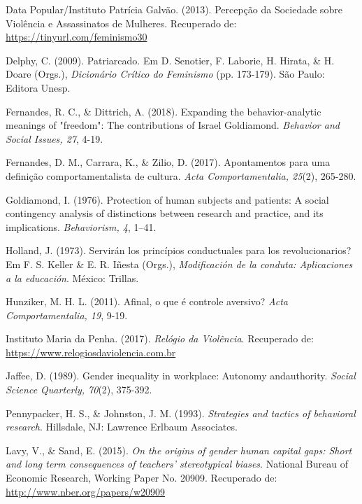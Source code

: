 \hangindent=25pt
\noindent Data Popular/Instituto Patrícia Galvão. (2013). Percepção da Sociedade sobre Violência e Assassinatos de Mulheres. Recuperado de: 
\url{https://tinyurl.com/feminismo30}

\hangindent=25pt
\noindent Delphy, C. (2009). Patriarcado. Em D. Senotier, F. Laborie, H. Hirata, \& H. Doare (Orgs.), \textit{Dicionário Crítico do Feminismo} (pp. 173-179). São Paulo: Editora Unesp.

\hangindent=25pt
\noindent Fernandes, R. C., \& Dittrich, A. (2018). Expanding the behavior-analytic meanings of "freedom": The contributions of Israel Goldiamond. \textit{Behavior and Social Issues, 27}, 4-19.

\hangindent=25pt
\noindent Fernandes, D. M., Carrara, K., \& Zilio, D. (2017). Apontamentos para uma definição comportamentalista de cultura. \textit{Acta Comportamentalia, 25}(2), 265-280.

\hangindent=25pt
\noindent Goldiamond, I. (1976). Protection of human subjects and patients: A social contingency analysis of distinctions between research and practice, and its implications. \textit{Behaviorism, 4}, 1–41.

\hangindent=25pt
\noindent Holland, J. (1973). Servirán los princípios conductuales para los revolucionarios? Em F. S. Keller \& E. R. Iñesta (Orgs.), \textit{Modificación de la conduta: Aplicaciones a la educación}. México: Trillas.

\hangindent=25pt
\noindent Hunziker, M. H. L. (2011). Afinal, o que é controle aversivo? \textit{Acta Comportamentalia, 19}, 9-19.

\hangindent=25pt
\noindent Instituto Maria da Penha. (2017). \textit{Relógio da Violência}. Recuperado de: \url{https://www.relogiosdaviolencia.com.br}

\hangindent=25pt
\noindent Jaffee, D. (1989). Gender inequality in workplace: Autonomy and\linebreak authority. \textit{Social Science Quarterly, 70}(2), 375-392.

\hangindent=25pt
\noindent Pennypacker, H. S., \& Johnston, J. M. (1993). \textit{Strategies and tactics of behavioral research}. Hillsdale, NJ: Lawrence Erlbaum Associates.

\hangindent=25pt
\noindent Lavy, V., \& Sand, E. (2015). \textit{On the origins of gender human capital gaps: Short and long term consequences of teachers’ stereotypical biases}. National Bureau of Economic Research, Working Paper No. 20909. Recuperado de: \url{http://www.nber.org/papers/w20909}

